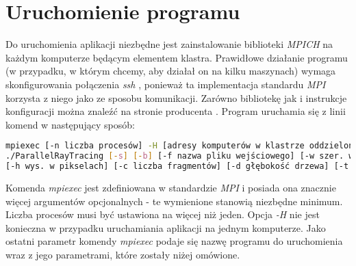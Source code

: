 \section{Uruchomienie programu}

Do uruchomienia aplikacji niezbędne jest zainstalowanie biblioteki \emph{MPICH} na każdym komputerze będącym elementem klastra. Prawidłowe działanie programu (w przypadku, w którym chcemy, aby działał on na kilku maszynach) wymaga skonfigurowania połączenia \emph{ssh} , ponieważ ta implementacja standardu \emph{MPI} korzysta z niego jako ze sposobu komunikacji. Zarówno bibliotekę jak i instrukcje konfiguracji można znaleźć na stronie producenta \cite{mpich}. Program uruchamia się z linii komend w następujący sposób:
\begin{center}
\begin{lstlisting}[language=bash, deletekeywords={test}, keepspaces=true, columns=flexible, caption={Uruchomienie programu}]
mpiexec [-n liczba procesów] -H [adresy komputerów w klastrze oddzielone przecinkami]
./ParallelRayTracing [-s] [-b] [-f nazwa pliku wejściowego] [-w szer. w pikselach]
[-h wys. w pikselach] [-c liczba fragmentów] [-d głębokość drzewa] [-t liczba testów]
\end{lstlisting}
\end{center}
Komenda \emph{mpiexec} jest zdefiniowana w standardzie \emph{MPI} i posiada ona znacznie więcej argumentów opcjonalnych - te wymienione stanowią niezbędne minimum. Liczba procesów musi być ustawiona na więcej niż jeden. Opcja \emph{-H} nie jest konieczna w przypadku uruchamiania aplikacji na jednym komputerze. Jako ostatni parametr komendy \emph{mpiexec} podaje się nazwę programu do uruchomienia wraz z jego parametrami, które zostały niżej omówione.


